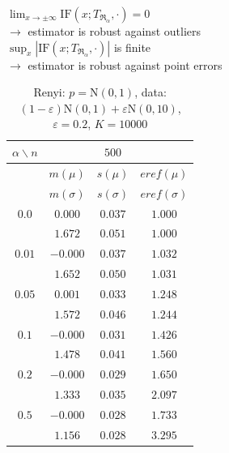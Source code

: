 \documentclass[11pt,a4paper]{beamer}
\begin{document}
\begin{frame}
	$\lim_{x\rightarrow \pm\infty}\mathrm{IF}(x;T_{\mathfrak{R}_\alpha},\cdot) = 0 $ \\
	$\rightarrow$ estimator is robust against outliers \\
	$\sup_{x}{|\mathrm{IF}(x;T_{\mathfrak{R}_\alpha},\cdot)|}$   is finite \\
		$\rightarrow$ estimator is robust against point errors

\end{frame}

\begin{frame} 
\begin{table}[ht] \footnotesize 
\begin{center} 
\begin{tabular}{|c|ccc|} 
\hline 
$\alpha\backslash n$ &&  $500$ & \\ 
\hline 
& $m(\mu)$ & $s(\mu)$ & $eref(\mu)$  \\ 
& $m(\sigma)$ & $s(\sigma)$ & $eref(\sigma)$ \\ 
\hline 
$0.0$ & $ 0.000 $ & $ 0.037 $ & $ 1.000 $\\ 
 & $ 1.672 $ & $ 0.051 $ & $ 1.000 $\\ 
\hline 
$0.01$ &  $ -0.000 $ & $ 0.037 $ & $ 1.032 $\\ 
 & $ 1.652 $ & $ 0.050 $ & $ 1.031 $\\ 
\hline 
$0.05$ &  $ 0.001 $ & $ 0.033 $ & $ 1.248 $\\ 
 &$ 1.572 $ & $ 0.046 $ & $ 1.244 $\\ 
\hline 
$0.1$ & $ -0.000 $ & $ 0.031 $ & $ 1.426 $\\ 
 &  $ 1.478 $ & $ 0.041 $ & $ 1.560 $\\ 
\hline 
$0.2$ & $ -0.000 $ & $ 0.029 $ & $ 1.650 $\\ 
 & $ 1.333 $ & $ 0.035 $ & $ 2.097 $\\ 
\hline 
$0.5$ & $ -0.000 $ & $ 0.028 $ & $ 1.733 $\\ 
 &  $ 1.156 $ & $ 0.028 $ & $ 3.295 $\\ 
\hline 
\end{tabular}
\caption{Renyi: $p = \mathrm{N}(0,1)$, data: $(1-\varepsilon)\mathrm{N}(0,1) + \varepsilon \mathrm{N}(0,10)$, $\varepsilon =  0.2$, $K = 10000$} 
\end{center}
\end{table}
\end{frame}
\end{document}
